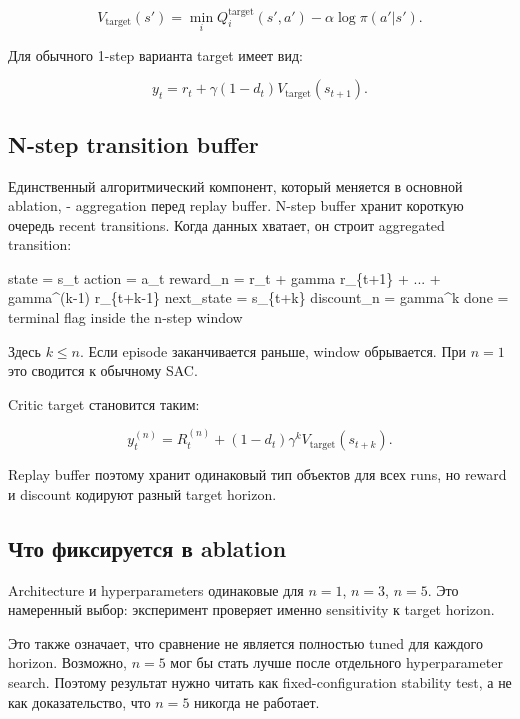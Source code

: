\documentclass[
  russian,
]{article}
\newenvironment{Shaded}{}{}
\newcommand{\NormalTok}[1]{#1}
\begin{document}
\[
V_{\text{target}}(s') =
\min_i Q_i^{\text{target}}(s', a') - \alpha \log \pi(a'|s').
\]

Для обычного 1-step варианта target имеет вид:

\[
y_t = r_t + \gamma (1-d_t) V_{\text{target}}(s_{t+1}).
\]

\subsection{N-step transition buffer}\label{n-step-transition-buffer}

Единственный алгоритмический компонент, который меняется в основной
ablation, - aggregation перед replay buffer. N-step buffer хранит
короткую очередь recent transitions. Когда данных хватает, он строит
aggregated transition:

\begin{Shaded}
\begin{Highlighting}[]
\NormalTok{state      = s\_t}
\NormalTok{action     = a\_t}
\NormalTok{reward\_n   = r\_t + gamma r\_\{t+1\} + ... + gamma\^{}(k{-}1) r\_\{t+k{-}1\}}
\NormalTok{next\_state = s\_\{t+k\}}
\NormalTok{discount\_n = gamma\^{}k}
\NormalTok{done       = terminal flag inside the n{-}step window}
\end{Highlighting}
\end{Shaded}

Здесь \(k \leq n\). Если episode заканчивается раньше, window
обрывается. При \(n=1\) это сводится к обычному SAC.

Critic target становится таким:

\[
y_t^{(n)} = R_t^{(n)} + (1-d_t) \gamma^k V_{\text{target}}(s_{t+k}).
\]

Replay buffer поэтому хранит одинаковый тип объектов для всех runs, но
reward и discount кодируют разный target horizon.

\subsection{Что фиксируется в
ablation}\label{ux447ux442ux43e-ux444ux438ux43aux441ux438ux440ux443ux435ux442ux441ux44f-ux432-ablation}

Architecture и hyperparameters одинаковые для \(n=1\), \(n=3\), \(n=5\).
Это намеренный выбор: эксперимент проверяет именно sensitivity к target
horizon.

\begin{notegray}
Это также означает, что сравнение не является полностью tuned для каждого horizon. Возможно, $n=5$ мог бы стать лучше после отдельного hyperparameter search. Поэтому результат нужно читать как fixed-configuration stability test, а не как доказательство, что $n=5$ никогда не работает.
\end{notegray}
\end{document}
